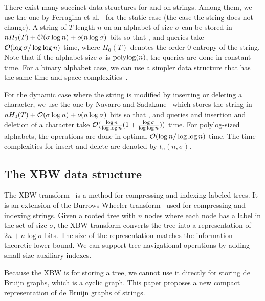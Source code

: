 
There exist many succinct data structures for {\rank} and {\select} on strings.
Among them, we use the one by Ferragina et al.~\cite{FerManMakNav06} for the static case
(the case the string does not change).  A string of $T$ length $n$ on an alphabet of size $\sigma$
can be stored in $nH_0(T) + \mathcal{O}(\sigma \log n) + o(n \log\sigma)$ bits so that
{\rank}, {\select} and {\access} queries take $\mathcal{O}(\log\sigma / \log\log n)$ time,
where $H_0(T)$ denotes the order-$0$ entropy of the string.  Note that if the alphabet size $\sigma$
is ${\mathop{\mathrm{polylog}}\nolimits}(n)$, the queries are done in constant time.  For a binary alphabet case,
we can use a simpler data structure that has the same time and space complexities~\cite{RRR07}.

For the dynamic case where the string is modified by inserting or deleting a character,
we use the one by Navarro and Sadakane~\cite{NavSad10} which stores the string
in $nH_0(T) + \mathcal{O}(\sigma \log n) + o(n \log\sigma)$ bits so that
{\rank}, {\select} and {\access} queries and insertion and deletion of a character take
$\mathcal{O}(\frac{\log n}{\log \log n}(1+\frac{\log\sigma}{\log\log n}))$ time.
For polylog-sized alphabets, the operations are done in optimal $\mathcal{O}(\log n/\log \log n)$ time.
The time complexities for insert and delete are denoted by $t_u(n,\sigma)$.


\subsection{The XBW data structure}
The XBW-transform~\cite{FLMM09} is a method for compressing and indexing labeled trees.
It is an extension of the Burrows-Wheeler transform~\cite{BW94} used for compressing
and indexing strings.  Given a rooted tree with $n$ nodes where each node has a label in
the set of size $\sigma$, the XBW-transform converts the tree into a representation of
$2n + n \log\sigma$ bits.  The size of the representation matches the information-theoretic
lower bound.  We can support tree navigational operations by adding small-size auxiliary
indexes.

Because the XBW is for storing a tree, we cannot use it directly for storing de Bruijn graphs,
which is a cyclic graph.
This paper proposes a new compact representation of de Bruijn graphs of strings.


